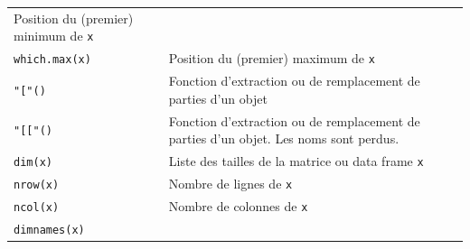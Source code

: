 \documentclass[
  11pt,
]{book}
\numberwithin{equation}{section}
\numberwithin{countremarque}{section}
\begin{document}
\begin{longtable}[]{@{}ll@{}}
\begin{minipage}[t]{0.53\columnwidth}
Position du (premier) minimum de \texttt{x}\strut
\end{minipage}\tabularnewline
\begin{minipage}[t]{0.41\columnwidth}\raggedright
\texttt{which.max(x)}\strut
\end{minipage} & \begin{minipage}[t]{0.53\columnwidth}\raggedright
Position du (premier) maximum de \texttt{x}\strut
\end{minipage}\tabularnewline
\begin{minipage}[t]{0.41\columnwidth}\raggedright
\texttt{"{[}"()}\strut
\end{minipage} & \begin{minipage}[t]{0.53\columnwidth}\raggedright
Fonction d'extraction ou de remplacement de parties d'un objet\strut
\end{minipage}\tabularnewline
\begin{minipage}[t]{0.41\columnwidth}\raggedright
\texttt{"{[}{[}"()}\strut
\end{minipage} & \begin{minipage}[t]{0.53\columnwidth}\raggedright
Fonction d'extraction ou de remplacement de parties d'un objet. Les noms sont perdus.\strut
\end{minipage}\tabularnewline
\begin{minipage}[t]{0.41\columnwidth}\raggedright
\texttt{dim(x)}\strut
\end{minipage} & \begin{minipage}[t]{0.53\columnwidth}\raggedright
Liste des tailles de la matrice ou data frame \texttt{x}\strut
\end{minipage}\tabularnewline
\begin{minipage}[t]{0.41\columnwidth}\raggedright
\texttt{nrow(x)}\strut
\end{minipage} & \begin{minipage}[t]{0.53\columnwidth}\raggedright
Nombre de lignes de \texttt{x}\strut
\end{minipage}\tabularnewline
\begin{minipage}[t]{0.41\columnwidth}\raggedright
\texttt{ncol(x)}\strut
\end{minipage} & \begin{minipage}[t]{0.53\columnwidth}\raggedright
Nombre de colonnes de \texttt{x}\strut
\end{minipage}\tabularnewline
\begin{minipage}[t]{0.41\columnwidth}\raggedright
\texttt{dimnames(x)}\strut
\end{minipage} & \begin{minipage}[t]{0.53\columnwidth}\raggedright

\end{minipage}
\end{longtable}
\end{document}
